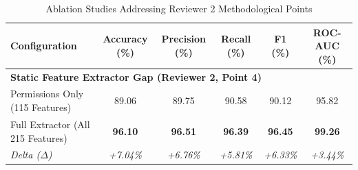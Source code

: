 \begin{table}[t]
\centering
\caption{Ablation Studies Addressing Reviewer 2 Methodological Points}
\label{tab:ablations}
\begin{tabular}{lccccc}
\hline
\textbf{Configuration} & \textbf{Accuracy (\%)} & \textbf{Precision (\%)} & \textbf{Recall (\%)} & \textbf{F1 (\%)} & \textbf{ROC-AUC (\%)} \\
\hline
\multicolumn{6}{l}{\textbf{Static Feature Extractor Gap (Reviewer 2, Point 4)}} \\
Permissions Only (115 Features) & 89.06 & 89.75 & 90.58 & 90.12 & 95.82 \\
Full Extractor (All 215 Features) & \textbf{96.10} & \textbf{96.51} & \textbf{96.39} & \textbf{96.45} & \textbf{99.26} \\
\textit{Delta ($\Delta$)} & \textit{+7.04\%} & \textit{+6.76\%} & \textit{+5.81\%} & \textit{+6.33\%} & \textit{+3.44\%} \\
\hline
\end{tabular}
\end{table}
